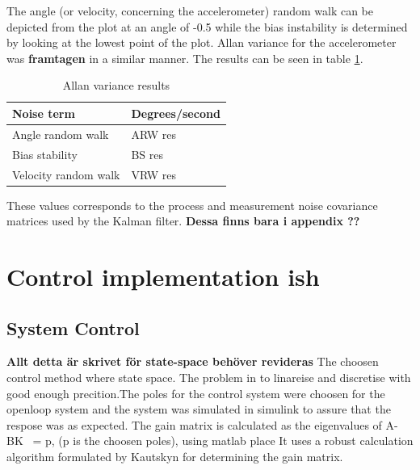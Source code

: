 \documentclass[a4paper,11pt]{kth-mag}
\begin{document}
The angle (or velocity, concerning the accelerometer) random walk can be depicted from the plot at an angle of -0.5 while the bias instability is determined by looking at the lowest point of the plot. Allan variance for the accelerometer was \textbf{framtagen} in a similar manner.  The results can be seen in table \ref{Table: Allan variance}.

\begin{table}[!hbt]
\centering
    \begin{tabular}{| l | l |} \hline
    Noise term & Degrees/second \\ \hline
    Angle random walk & ARW res \\ \hline
    Bias stability & BS res \\ \hline
    Velocity random walk & VRW res \\
    \hline
    \end{tabular}
    \caption{Allan variance results}
    \label{Table: Allan variance}
\end{table}

These values corresponds to the process and measurement noise covariance matrices used by the Kalman filter. \textbf{Dessa finns bara i appendix ??} 

\section{Control implementation ish}


\subsection{System Control}
\textbf{Allt detta är skrivet för state-space behöver revideras}
The choosen control method where state space. The problem in to linareise and discretise with good enough precition.The poles for the control system were choosen for the openloop system and the system was simulated in 
	simulink to assure that the respose was as expected. 
	The gain matrix is calculated as the eigenvalues of A-BK ~= p, (p is the choosen poles), using matlab place
	It uses a robust calculation algorithm formulated by Kautskyn for determining the gain matrix.
\end{document}
